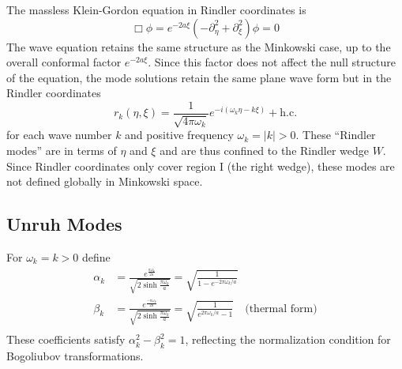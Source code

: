 \documentclass[12pt,a4paper]{article}
\begin{document}
The massless Klein-Gordon equation in Rindler coordinates is
\begin{equation}
  \Box \phi = e^{-2a \xi}(-\partial_\eta^2 + \partial_\xi^2) \phi = 0
\end{equation}
The wave equation retains the same structure as the Minkowski case, up to the overall conformal factor $e^{-2a\xi}$. Since this factor does not affect the null structure of the equation, the mode solutions retain the same plane wave form but in the Rindler coordinates
\begin{equation}
 r_k(\eta,\xi) = \frac{1}{\sqrt{4 \pi \omega_k}} e^{-i(\omega_k \eta -k \xi)} + \text{h.c.}
\end{equation}
for each wave number $k$ and positive frequency $\omega_k = |k| > 0$.  These ``Rindler modes'' are in terms of $\eta$ and $\xi$ and are thus confined to the Rindler wedge $W$.  Since Rindler coordinates only cover region I (the right wedge), these modes are not defined globally in Minkowski space.

\subsection{Unruh Modes}
For $\omega_k = k > 0$ define
\begin{equation}
  \begin{aligned}
    \alpha_k &= \frac{e^{\frac{\pi\omega_k}{2a}}}{\sqrt{2 \sinh \frac{\pi \omega_k}{a}}} = \sqrt{\frac{1}{1 - e^{-2\pi\omega_k / a}}}  \\
    \beta_k &= \frac{e^{\frac{-\pi\omega_k}{2a}}}{\sqrt{2 \sinh \frac{\pi \omega_k}{a}}} = \sqrt{\frac{1}{e^{2\pi\omega_k / a} - 1}} \quad \text{(thermal form)} \\
  \end{aligned}
  \label{alpha_beta}
\end{equation}
These coefficients satisfy $\alpha_k^2 - \beta_k^2 = 1$, reflecting the normalization condition for Bogoliubov transformations.
\end{document}
